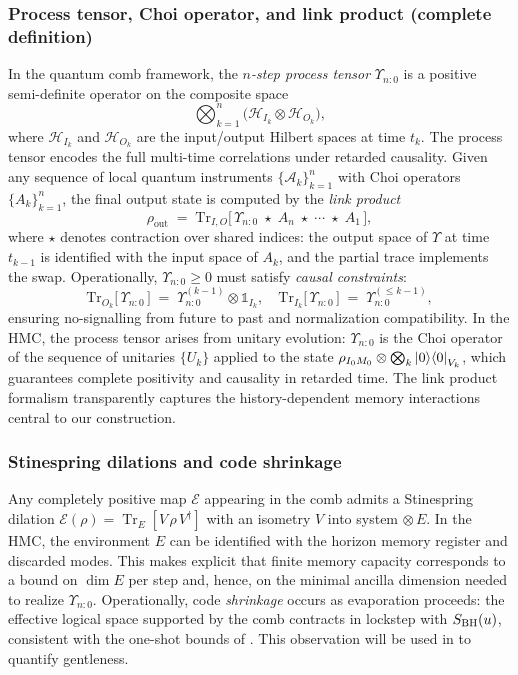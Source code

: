 \documentclass[a4paper,11pt]{article}
\newcommand{\HMC}{\textsc{HMC}\xspace}
\theoremstyle{plain}
\theoremstyle{definition}
\theoremstyle{remark}
\begin{document}
\subsubsection{Process tensor, Choi operator, and link product (complete definition)}
\label{sssec:choi-link}
In the quantum comb framework, the \emph{$n$-step process tensor} $\Upsilon_{n{:}0}$ is a positive semi-definite operator on the composite space
\[
\bigotimes_{k=1}^n \bigl(\mathcal{H}_{I_k}\otimes\mathcal{H}_{O_k}\bigr),
\]
where $\mathcal{H}_{I_k}$ and $\mathcal{H}_{O_k}$ are the input/output Hilbert spaces at time $t_k$. The process tensor encodes the full multi-time correlations under retarded causality. Given any sequence of local quantum instruments $\{\mathcal{A}_k\}_{k=1}^n$ with Choi operators $\{A_k\}_{k=1}^n$, the final output state is computed by the \emph{link product}
\begin{equation}\label{eq:link-product}
\rho_{\mathrm{out}} \;=\; \mathrm{Tr}_{I,O}\!\Big[\,\Upsilon_{n{:}0} \;\star\; A_n \;\star\; \cdots \;\star\; A_1\,\Big],
\end{equation}
where $\star$ denotes contraction over shared indices: the output space of $\Upsilon$ at time $t_{k-1}$ is identified with the input space of $A_k$, and the partial trace implements the swap. Operationally, $\Upsilon_{n{:}0}\ge 0$ must satisfy \emph{causal constraints}:
\begin{equation}
\mathrm{Tr}_{O_k}\!\bigl[\,\Upsilon_{n{:}0}\,\bigr] \;=\; \Upsilon_{n{:}0}^{(k-1)}\otimes \mathbb{1}_{I_k},
\quad \mathrm{Tr}_{I_k}\!\bigl[\,\Upsilon_{n{:}0}\,\bigr] \;=\; \Upsilon_{n{:}0}^{(\le k-1)},
\end{equation}
ensuring no-signalling from future to past and normalization compatibility. In the \HMC{}, the process tensor arises from unitary evolution: $\Upsilon_{n{:}0}$ is the Choi operator of the sequence of unitaries $\{U_k\}$ applied to the state $\rho_{I_0M_0}\otimes\bigotimes_k\left|0\right\rangle\!\left\langle0\right|_{V_k}$, which guarantees complete positivity and causality in retarded time. The link product formalism transparently captures the history-dependent memory interactions central to our construction.


\subsubsection{Stinespring dilations and code shrinkage}
\label{sssec:dilation}
Any completely positive map $\mathcal{E}$ appearing in the comb admits a Stinespring dilation $\mathcal{E}(\rho)=\operatorname{Tr}_E[ V \, \rho \, V^\dagger ]$ with an isometry $V$ into system$\,\otimes E$. In the \HMC{}, the environment $E$ can be identified with the horizon memory register and discarded modes. This makes explicit that finite memory capacity corresponds to a bound on $\dim E$ per step and, hence, on the minimal ancilla dimension needed to realize $\Upsilon_{n{:}0}$. Operationally, code \emph{shrinkage} occurs as evaporation proceeds: the effective logical space supported by the comb contracts in lockstep with $S_{\rm BH}(u)$, consistent with the one-shot bounds of . This observation will be used in  to quantify gentleness.
\end{document}
